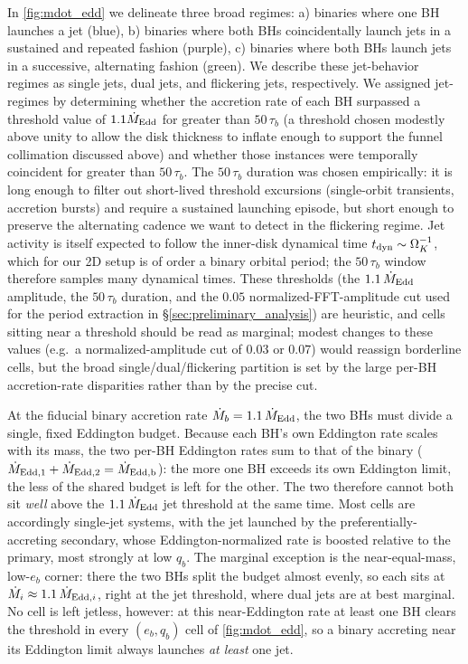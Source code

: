 \documentclass[fleqn,usenatbib]{mnras}
\begin{document}
In \autoref{fig:mdot_edd} we delineate three broad regimes: a) binaries where one BH launches a jet (blue), b) binaries where both BHs coincidentally launch jets in a sustained and repeated fashion (purple), c) binaries where both BHs launch jets in a successive, alternating fashion (green). We describe these jet-behavior regimes as single jets, dual jets, and flickering jets, respectively. We assigned jet-regimes by determining whether the accretion rate of each BH surpassed a threshold value of $1.1 \dot{M}_{\rm Edd}$ for greater than $50\,\tau_b$ (a threshold chosen modestly above unity to allow the disk thickness to inflate enough to support the funnel collimation discussed above) and whether those instances were temporally coincident for greater than $50\,\tau_b$. The $50\,\tau_b$ duration was chosen empirically: it is long enough to filter out short-lived threshold excursions (single-orbit transients, accretion bursts) and require a sustained launching episode, but short enough to preserve the alternating cadence we want to detect in the flickering regime. Jet activity is itself expected to follow the inner-disk dynamical time $t_{\rm dyn} \sim \Omega_K^{-1}$, which for our 2D setup is of order a binary orbital period; the $50\,\tau_b$ window therefore samples many dynamical times. These thresholds (the $1.1\,\dot{M}_{\rm Edd}$ amplitude, the $50\,\tau_b$ duration, and the $0.05$ normalized-FFT-amplitude cut used for the period extraction in \S\ref{sec:preliminary_analysis}) are heuristic, and cells sitting near a threshold should be read as marginal; modest changes to these values (e.g.\ a normalized-amplitude cut of $0.03$ or $0.07$) would reassign borderline cells, but the broad single/dual/flickering partition is set by the large per-BH accretion-rate disparities rather than by the precise cut.

At the fiducial binary accretion rate $\dot{M}_b = 1.1\,\dot{M}_{\rm Edd}$, the two BHs must divide a single, fixed Eddington budget. Because each BH's own Eddington rate scales with its mass, the two per-BH Eddington rates sum to that of the binary ($\dot{M}_{\rm Edd,1} + \dot{M}_{\rm Edd,2} = \dot{M}_{\rm Edd,b}$): the more one BH exceeds its own Eddington limit, the less of the shared budget is left for the other. The two therefore cannot both sit \textit{well} above the $1.1\,\dot{M}_{\rm Edd}$ jet threshold at the same time. Most cells are accordingly single-jet systems, with the jet launched by the preferentially-accreting secondary, whose Eddington-normalized rate is boosted relative to the primary, most strongly at low $q_b$. The marginal exception is the near-equal-mass, low-$e_b$ corner: there the two BHs split the budget almost evenly, so each sits at $\dot{M}_i \approx 1.1\,\dot{M}_{{\rm Edd},i}$, right at the jet threshold, where dual jets are at best marginal. No cell is left jetless, however: at this near-Eddington rate at least one BH clears the threshold in every $(e_b, q_b)$ cell of \autoref{fig:mdot_edd}, so a binary accreting near its Eddington limit always launches \textit{at least} one jet.
\end{document}
